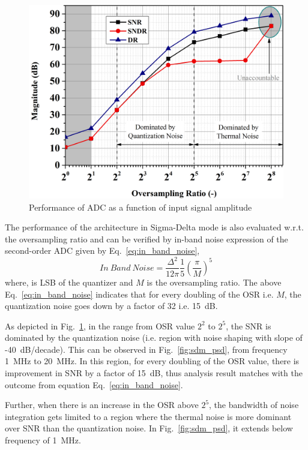 %
\begin{figure}[h!]
    \centering
    \includegraphics[width=0.8\columnwidth]{Chap06/Figures/snr_vs_osr_sd.jpg}
    \caption{Performance of \textSigma \textDelta ADC as a function of input signal amplitude }
    \label{fig:sdm_snr_vs_osr}
\end{figure}
%
The performance of the architecture in Sigma-Delta mode is also evaluated w.r.t. the oversampling ratio and can be verified by in-band noise expression of the second-order \textSigma \textDelta ADC given by Eq.~\ref{eq:in_band_noise},
%
\begin{equation}\label{eq:in_band_noise}
    In\ Band\ Noise =\frac{\Delta^2}{12\pi}\frac{1}{5}\left(\frac{\pi}{M}\right)^5
\end{equation}
%
where, \textDelta is LSB of the quantizer and $M$ is the oversampling ratio.
The above Eq.~\ref{eq:in_band_noise} indicates that for every doubling of the OSR i.e. $M$, the quantization noise goes down by a factor of 32 i.e. 15~dB. 

As depicted in Fig.~\ref{fig:sdm_snr_vs_osr}, in the range from OSR value $2^2$ to $2^5$, the SNR is dominated by the quantization noise (i.e. region with noise shaping with slope of -40~dB/decade). This can be observed in Fig.~\ref{fig:sdm_psd}, from frequency 1~MHz to 20~MHz. In this region, for every doubling of the OSR value, there is improvement in SNR by a factor of 15~dB, thus analysis result matches with the outcome from equation Eq.~\ref{eq:in_band_noise}.

Further, when there is an increase in the OSR above $2^5$, the bandwidth of noise integration gets limited to a region where the thermal noise is more dominant over SNR than the quantization noise. In Fig.~\ref{fig:sdm_psd}, it extends below frequency of 1~MHz. 

